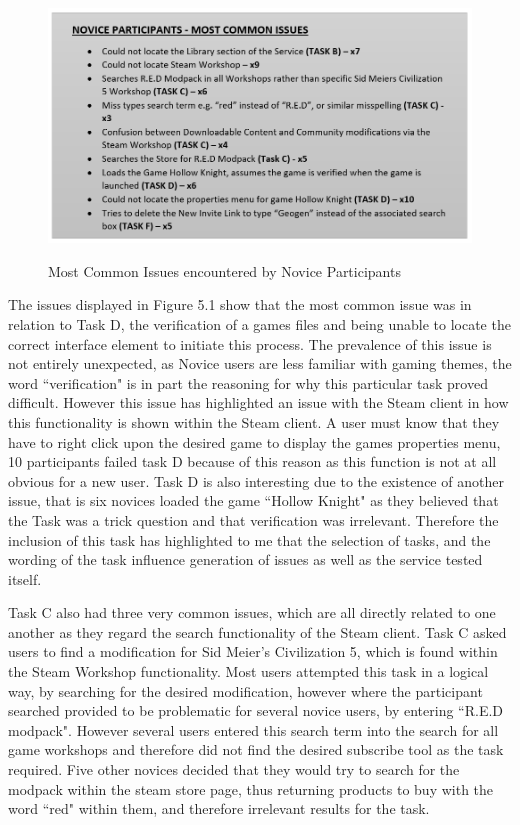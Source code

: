 \begin{figure}[H]
\includegraphics[width=\linewidth]{Screenshots/ErrorRecords/Novice/noviceMostCommonIssues.png}
\label{NoviceMostCommonErrors}
\caption{Most Common Issues encountered by Novice Participants}
\end{figure}

The issues displayed in Figure 5.1 show that the most common issue was in relation to Task D, the verification of a games files and being unable to locate the correct interface element to initiate this process. The prevalence of this issue is not entirely unexpected, as Novice users are less familiar with gaming themes, the word ``verification" is in part the reasoning for why this particular task proved difficult. However this issue has highlighted an issue with the Steam client in how this functionality is shown within the Steam client. A user must know that they have to right click upon the desired game to display the games properties menu, 10 participants failed task D because of this reason as this function is not at all obvious for a new user. Task D is also interesting due to the existence of another issue, that is six novices loaded the game ``Hollow Knight" as they believed that the Task was a trick question and that verification was irrelevant. Therefore the inclusion of this task has highlighted to me that the selection of tasks, and the wording of the task influence generation of issues as well as the service tested itself.

Task C also had three very common issues, which are all directly related to one another as they regard the search functionality of the Steam client. Task C asked users to find a modification for Sid Meier's Civilization 5, which is found within the Steam Workshop functionality. Most users attempted this task in a logical way, by searching for the desired modification, however where the participant searched provided to be problematic for several novice users, by entering ``R.E.D modpack". However several users entered this search term into the search for all game workshops and therefore did not find the desired subscribe tool as the task required. Five other novices decided that they would try to search for the modpack within the steam store page, thus returning products to buy with the word ``red" within them, and therefore irrelevant results for the task. 

